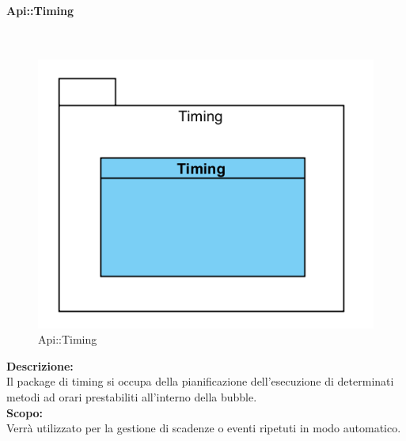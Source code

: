\begin{samepage}
\paragraph{Api\-::Timing}\label{api-timing}\mbox{}\\
\begin{figure}[H]
	\centering
	\includegraphics[width=14cm]{diagrammi_img/classi_e_package/api_timing.png}
	\caption{Api\-::Timing}
\end{figure}
\end{samepage}
\textbf{Descrizione:}\\
Il package di timing si occupa della pianificazione dell'esecuzione di determinati metodi ad orari prestabiliti all'interno della bubble.\\
\textbf{Scopo:}\\
Verrà utilizzato per la gestione di scadenze o eventi ripetuti in modo automatico.


